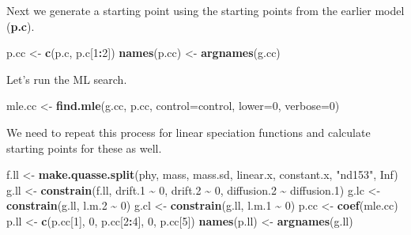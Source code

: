 \documentclass[
]{book}
\newenvironment{Shaded}{\begin{snugshade}}{\end{snugshade}}
\newcommand{\DataTypeTok}[1]{\textcolor[rgb]{0.13,0.29,0.53}{#1}}
\newcommand{\DecValTok}[1]{\textcolor[rgb]{0.00,0.00,0.81}{#1}}
\newcommand{\FloatTok}[1]{\textcolor[rgb]{0.00,0.00,0.81}{#1}}
\newcommand{\KeywordTok}[1]{\textcolor[rgb]{0.13,0.29,0.53}{\textbf{#1}}}
\newcommand{\NormalTok}[1]{#1}
\newcommand{\OperatorTok}[1]{\textcolor[rgb]{0.81,0.36,0.00}{\textbf{#1}}}
\newcommand{\OtherTok}[1]{\textcolor[rgb]{0.56,0.35,0.01}{#1}}
\newcommand{\StringTok}[1]{\textcolor[rgb]{0.31,0.60,0.02}{#1}}
\begin{document}
Next we generate a starting point using the starting points from the earlier model (\textbf{p.c}).

\begin{Shaded}
\begin{Highlighting}[]
\NormalTok{p.cc \textless{}{-}}\StringTok{ }\KeywordTok{c}\NormalTok{(p.c, p.c[}\DecValTok{1}\OperatorTok{:}\DecValTok{2}\NormalTok{])}
\KeywordTok{names}\NormalTok{(p.cc) \textless{}{-}}\StringTok{ }\KeywordTok{argnames}\NormalTok{(g.cc)}
\end{Highlighting}
\end{Shaded}

Let's run the ML search.

\begin{Shaded}
\begin{Highlighting}[]
\NormalTok{mle.cc \textless{}{-}}\StringTok{ }\KeywordTok{find.mle}\NormalTok{(g.cc, p.cc, }\DataTypeTok{control=}\NormalTok{control, }\DataTypeTok{lower=}\DecValTok{0}\NormalTok{, }\DataTypeTok{verbose=}\DecValTok{0}\NormalTok{)}
\end{Highlighting}
\end{Shaded}

We need to repeat this process for linear speciation functions and calculate starting points for these as well.

\begin{Shaded}
\begin{Highlighting}[]
\NormalTok{f.ll \textless{}{-}}\StringTok{ }\KeywordTok{make.quasse.split}\NormalTok{(phy, mass, mass.sd, linear.x, constant.x, }\StringTok{"nd153"}\NormalTok{, }\OtherTok{Inf}\NormalTok{)}
\NormalTok{g.ll \textless{}{-}}\StringTok{ }\KeywordTok{constrain}\NormalTok{(f.ll, drift}\FloatTok{.1} \OperatorTok{\textasciitilde{}}\StringTok{ }\DecValTok{0}\NormalTok{, drift}\FloatTok{.2} \OperatorTok{\textasciitilde{}}\StringTok{ }\DecValTok{0}\NormalTok{, diffusion}\FloatTok{.2} \OperatorTok{\textasciitilde{}}\StringTok{ }\NormalTok{diffusion}\FloatTok{.1}\NormalTok{)}
\NormalTok{g.lc \textless{}{-}}\StringTok{ }\KeywordTok{constrain}\NormalTok{(g.ll, l.m}\FloatTok{.2} \OperatorTok{\textasciitilde{}}\StringTok{ }\DecValTok{0}\NormalTok{)}
\NormalTok{g.cl \textless{}{-}}\StringTok{ }\KeywordTok{constrain}\NormalTok{(g.ll, l.m}\FloatTok{.1} \OperatorTok{\textasciitilde{}}\StringTok{ }\DecValTok{0}\NormalTok{)}
\NormalTok{p.cc \textless{}{-}}\StringTok{ }\KeywordTok{coef}\NormalTok{(mle.cc)}
\NormalTok{p.ll \textless{}{-}}\StringTok{ }\KeywordTok{c}\NormalTok{(p.cc[}\DecValTok{1}\NormalTok{], }\DecValTok{0}\NormalTok{, p.cc[}\DecValTok{2}\OperatorTok{:}\DecValTok{4}\NormalTok{], }\DecValTok{0}\NormalTok{, p.cc[}\DecValTok{5}\NormalTok{])}
\KeywordTok{names}\NormalTok{(p.ll) \textless{}{-}}\StringTok{ }\KeywordTok{argnames}\NormalTok{(g.ll)}
\end{Highlighting}
\end{Shaded}
\end{document}
